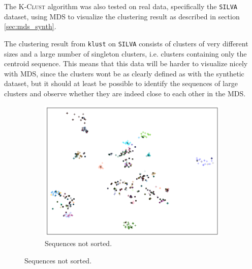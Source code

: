 The \textsc{K-Clust} algorithm was also tested on real data, specifically the
\texttt{SILVA} dataset, using MDS to visualize the clustering result as
described in section \ref{sec:mds_synth}.

The clustering result from \texttt{klust} on \texttt{SILVA} consists of
clusters of very different sizes and a large number of singleton clusters, i.e.
clusters containing only the centroid sequence. This means that this data will
be harder to visualize nicely with MDS, since the clusters wont be as clearly
defined as with the synthetic dataset, but it should at least be possible to
identify the sequences of large clusters and observe whether they are indeed
close to each other in the MDS.

\begin{figure}[H]
  \centering
  \begin{subfigure}[t]{1.0\textwidth}
    \includegraphics[width=1.0\textwidth]{graphics/SILVA_t-SNE_500.png}
    \caption{Sequences not sorted.}
    \label{fig:mds_silva_no_sort}
  \end{subfigure}


\end{figure}
